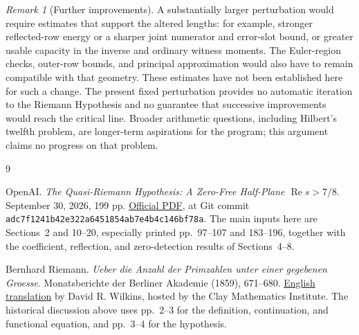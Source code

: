 \documentclass[10pt,reqno,a4paper]{amsart}
\theoremstyle{remark}
\newtheorem{remark}[theorem]{Remark}
\newcommand{\Rea}{\operatorname{Re}}
\begin{document}
\begin{remark}[Further improvements]\label{prospect}
A substantially larger perturbation would require estimates that
support the altered lengths:
for example, stronger reflected-row energy or a sharper joint
numerator and error-slot bound, or greater usable capacity in the
inverse and ordinary witness moments. The Euler-region checks,
outer-row bounds, and principal approximation would also have to
remain compatible with that geometry. These estimates have not
been established here for such a change. The present fixed
perturbation provides no automatic iteration to the Riemann
Hypothesis and no guarantee that successive improvements would
reach the critical line. Broader arithmetic questions, including
Hilbert's twelfth problem, are longer-term aspirations for the
program; this argument claims no progress on that problem.
\end{remark}

\begin{thebibliography}{9}

OpenAI.
\emph{The Quasi-Riemann Hypothesis: A Zero-Free Half-Plane
$\Rea s>7/8$}.
September 30, 2026, 199 pp.
\href{https://github.com/openai/math/blob/adc7f1241b42e322a6451854ab7e4b4c146bf78a/preprints/The-Quasi-Riemann-Hypothesis-September-30-2026/paper.pdf}{Official PDF},
at Git commit
\texttt{adc7f1241b42e322a6451854ab7e4b4c146bf78a}.
The main inputs here are Sections~2 and 10--20, especially
printed pp.~97--107 and 183--196, together with the coefficient,
reflection, and zero-detection results of Sections~4--8.

Bernhard Riemann.
\emph{Ueber die Anzahl der Primzahlen unter einer gegebenen Groesse}.
Monatsberichte der Berliner Akademie (1859), 671--680.
\href{https://www.claymath.org/library/historical/riemann/english/EZeta.pdf}{English translation}
by David R. Wilkins, hosted by the Clay Mathematics Institute.
The historical discussion above uses pp.~2--3 for the definition,
continuation, and functional equation, and pp.~3--4 for the hypothesis.

\end{thebibliography}
\end{document}
